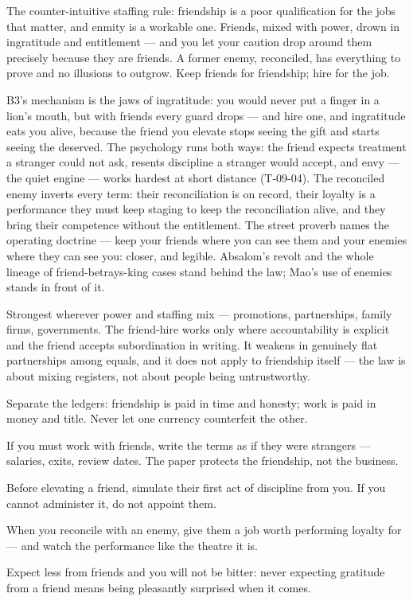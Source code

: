 \begin{core}
The counter-intuitive staffing rule: friendship is a poor qualification for the jobs that matter, and enmity is a workable one. Friends, mixed with power, drown in ingratitude and entitlement --- and you let your caution drop around them precisely because they are friends. A former enemy, reconciled, has everything to prove and no illusions to outgrow. Keep friends for friendship; hire for the job.
\end{core}
\begin{mechanism}
B3's mechanism is the jaws of ingratitude: you would never put a finger in a lion's mouth, but with friends every guard drops --- and hire one, and ingratitude eats you alive, because the friend you elevate stops seeing the gift and starts seeing the deserved. The psychology runs both ways: the friend expects treatment a stranger could not ask, resents discipline a stranger would accept, and envy --- the quiet engine --- works hardest at short distance (T-09-04). The reconciled enemy inverts every term: their reconciliation is on record, their loyalty is a performance they must keep staging to keep the reconciliation alive, and they bring their competence without the entitlement. The street proverb names the operating doctrine --- keep your friends where you can see them and your enemies where they can see you: closer, and legible. Absalom's revolt and the whole lineage of friend-betrays-king cases stand behind the law; Mao's use of enemies stands in front of it.
\end{mechanism}
\begin{conditions}
Strongest wherever power and staffing mix --- promotions, partnerships, family firms, governments. The friend-hire works only where accountability is explicit and the friend accepts subordination in writing. It weakens in genuinely flat partnerships among equals, and it does not apply to friendship itself --- the law is about mixing registers, not about people being untrustworthy.
\end{conditions}
\begin{application}
  \item Separate the ledgers: friendship is paid in time and honesty; work is paid in money and title. Never let one currency counterfeit the other.
  \item If you must work with friends, write the terms as if they were strangers --- salaries, exits, review dates. The paper protects the friendship, not the business.
  \item Before elevating a friend, simulate their first act of discipline from you. If you cannot administer it, do not appoint them.
  \item When you reconcile with an enemy, give them a job worth performing loyalty for --- and watch the performance like the theatre it is.
  \item Expect less from friends and you will not be bitter: never expecting gratitude from a friend means being pleasantly surprised when it comes.
\end{application}
